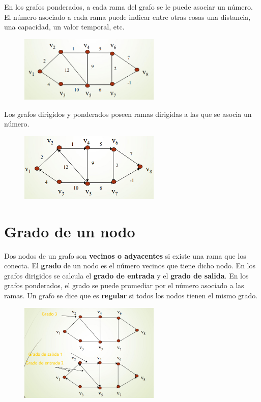 En los grafos ponderados, a cada rama del grafo se le puede asociar un número. El número asociado a cada rama puede indicar entre otras cosas una distancia, una capacidad, un valor temporal, etc.

\begin{figure}[h]
\centering
\includegraphics[width = 0.6\textwidth]{figs/grafo-ponderado.png}
\end{figure}

\newpage

Los grafos dirigidos y ponderados poseen ramas dirigidas a las que se asocia un número.

\begin{figure}[h]
\centering
\includegraphics[width = 0.6\textwidth]{figs/grafo-dirigido-ponderado.png}
\end{figure}

\section{Grado de un nodo}
Dos nodos de un grafo son \textbf{vecinos o adyacentes} si existe una rama que los conecta. El \textbf{grado} de un nodo es el número vecinos que tiene dicho nodo. En los grafos dirigidos se calcula el \textbf{grado de entrada} y el \textbf{grado de salida}. En los grafos ponderados, el grado se puede promediar por el número asociado a las ramas. Un grafo se dice que es \textbf{regular} si todos los nodos tienen el mismo grado.

\begin{figure}[h]
\centering
\includegraphics[width = 0.6\textwidth]{figs/grafo-grados.png}
\end{figure}

